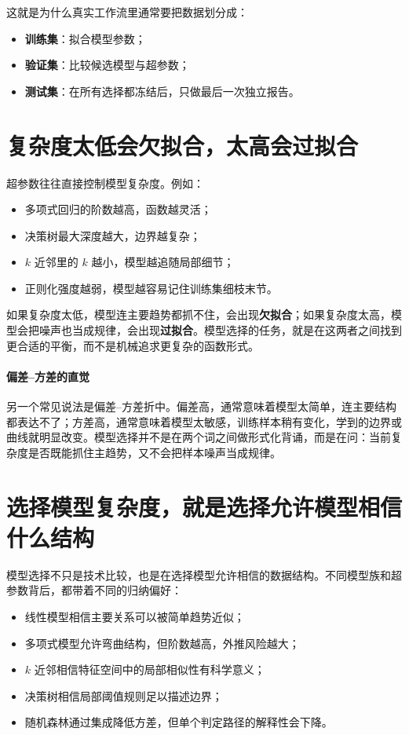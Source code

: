 这就是为什么真实工作流里通常要把数据划分成：

\begin{itemize}
    \item \textbf{训练集}：拟合模型参数；
    \item \textbf{验证集}：比较候选模型与超参数；
    \item \textbf{测试集}：在所有选择都冻结后，只做最后一次独立报告。
\end{itemize}

\section{复杂度太低会欠拟合，太高会过拟合}

超参数往往直接控制模型复杂度。例如：

\begin{itemize}
    \item 多项式回归的阶数越高，函数越灵活；
    \item 决策树最大深度越大，边界越复杂；
    \item $k$ 近邻里的 $k$ 越小，模型越追随局部细节；
    \item 正则化强度越弱，模型越容易记住训练集细枝末节。
\end{itemize}

如果复杂度太低，模型连主要趋势都抓不住，会出现\textbf{欠拟合}；如果复杂度太高，模型会把噪声也当成规律，会出现\textbf{过拟合}。模型选择的任务，就是在这两者之间找到更合适的平衡，而不是机械追求更复杂的函数形式。

\paragraph{偏差--方差的直觉}

另一个常见说法是偏差--方差折中。偏差高，通常意味着模型太简单，连主要结构都表达不了；方差高，通常意味着模型太敏感，训练样本稍有变化，学到的边界或曲线就明显改变。模型选择并不是在两个词之间做形式化背诵，而是在问：当前复杂度是否既能抓住主趋势，又不会把样本噪声当成规律。

\section{选择模型复杂度，就是选择允许模型相信什么结构}

模型选择不只是技术比较，也是在选择模型允许相信的数据结构。不同模型族和超参数背后，都带着不同的归纳偏好：

\begin{itemize}
    \item 线性模型相信主要关系可以被简单趋势近似；
    \item 多项式模型允许弯曲结构，但阶数越高，外推风险越大；
    \item $k$ 近邻相信特征空间中的局部相似性有科学意义；
    \item 决策树相信局部阈值规则足以描述边界；
    \item 随机森林通过集成降低方差，但单个判定路径的解释性会下降。
\end{itemize}

